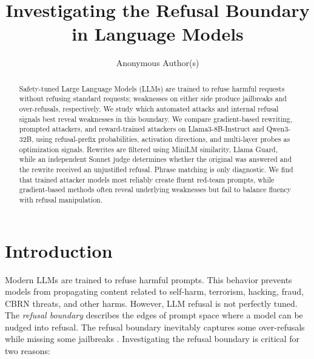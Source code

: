 \documentclass{article}
\title{Investigating the Refusal Boundary in Language Models}
\author{Anonymous Author(s)}
\begin{document}
\maketitle

\begin{abstract}
Safety-tuned Large Language Models (LLMs) are trained to refuse harmful requests without refusing standard requests; weaknesses on either side produce jailbreaks and over-refusals, respectively. We study which automated attacks and internal refusal signals best reveal weaknesses in this boundary. We compare gradient-based rewriting, prompted attackers, and reward-trained attackers on Llama3-8B-Instruct and Qwen3-32B, using refusal-prefix probabilities, activation directions, and multi-layer probes as optimization signals.
Rewrites are filtered using MiniLM similarity, Llama Guard, while an independent Sonnet judge determines whether the original was answered and the rewrite received an unjustified refusal. Phrase matching is only diagnostic. We find that trained attacker models most reliably create fluent red-team prompts, while gradient-based methods often reveal underlying weaknesses but fail to balance fluency with refusal manipulation.
\end{abstract}

\section{Introduction}

Modern LLMs are trained to refuse harmful prompts. This behavior prevents models from propagating content related to self-harm, terrorism, hacking, fraud, CBRN threats, and other harms. However, LLM refusal is not perfectly tuned. The \textit{refusal boundary} describes the edges of prompt space where a model can be nudged into refusal. The refusal boundary inevitably captures some over-refusals while missing some jailbreaks \citep{rottger2024xstest,cui2024orbench}. Investigating the refusal boundary is critical for two reasons:
\end{document}
